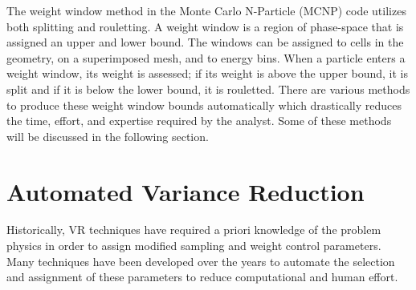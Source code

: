The weight window method in the Monte Carlo N-Particle (MCNP) code utilizes both
splitting and rouletting.  A weight window is a region of phase-space that is 
assigned an upper and lower bound.  The windows can be assigned to cells in the
geometry, on a superimposed mesh, and to energy bins.  When a particle enters
a weight window, its weight is assessed; if its weight is above the upper bound,
it is split and if it is below the lower bound, it is rouletted.  There are various
methods to produce these weight window bounds automatically which drastically reduces the
time, effort, and expertise required by the analyst.  Some of these methods will 
be discussed in the following section.


\section{Automated Variance Reduction}\label{sec:auto_vr}

Historically, VR techniques have required a priori knowledge of the problem physics
in order to assign modified sampling and weight control parameters.
Many techniques have been developed over the years to automate the selection and
assignment of these parameters to reduce computational and human effort.

